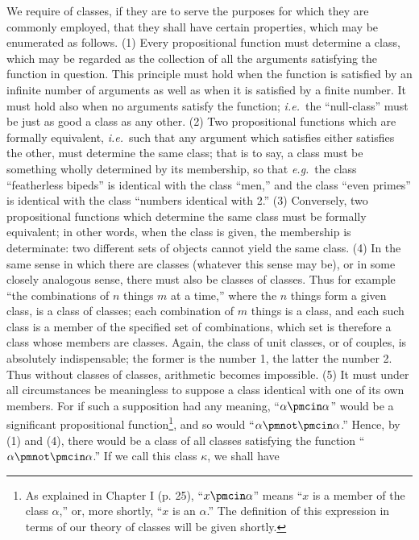 \documentclass[letterpaper,12pt,openany,leqno]{book}
\begin{document}
We require of classes, if they are to serve the purposes for which they are commonly employed, that they shall have certain properties, which may be enumerated as follows. (1) Every propositional function must determine a class, which may be regarded as the collection of all the arguments satisfying the function in question. This principle must hold when the function is satisfied by an infinite number of arguments as well as when it is satisfied by a finite number. It must hold also when no arguments satisfy the function; \textit{i.e.}\ the ``null-class'' must be just as good a class as any other. (2) Two propositional functions which are formally equivalent, \textit{i.e.}\ such that any argument which satisfies either satisfies the other, must determine the same class; that is to say, a class must be something wholly determined by its membership, so that \textit{e.g.}\ the class ``featherless bipeds'' is identical with the class ``men,'' and the class ``even primes'' is identical with the class ``numbers identical with 2.'' (3) Conversely, two propositional functions which determine the same class must be formally equivalent; in other words, when the class is given, the membership is determinate: two different sets of objects cannot yield the same class. (4) In the same sense in which there are classes (whatever this sense may be), or in some closely analogous sense, there must also be classes of classes. Thus for example ``the combinations of $n$ things $m$ at a time,'' where the $n$ things form a given class, is a class of classes; each combination of $m$ things is a class, and each such class is a member of the specified set of combinations, which set is therefore a class whose members are classes. Again, the class of unit classes, or of couples, is absolutely indispensable; the former is the number 1, the latter the number 2. Thus without classes of classes, arithmetic becomes impossible. (5) It must under all circumstances be meaningless to suppose a class identical with one of its own members. For if such a supposition had any meaning, ``$\alpha \pmcin \alpha$'' would be a significant propositional function\footnote{As explained in Chapter I (p. 25), ``$x \pmcin \alpha$'' means ``$x$ is a member of the class $\alpha$,'' or, more shortly, ``$x$ is an $\alpha$.'' The definition of this expression in terms of our theory of classes will be given shortly.}, and so would ``$\alpha \pmnot\pmcin \alpha$.'' Hence, by (1) and (4), there would be a class of all classes satisfying the function ``$\alpha \pmnot \pmcin \alpha$.'' If we call this class $\kappa$, we shall have 
\end{document}
